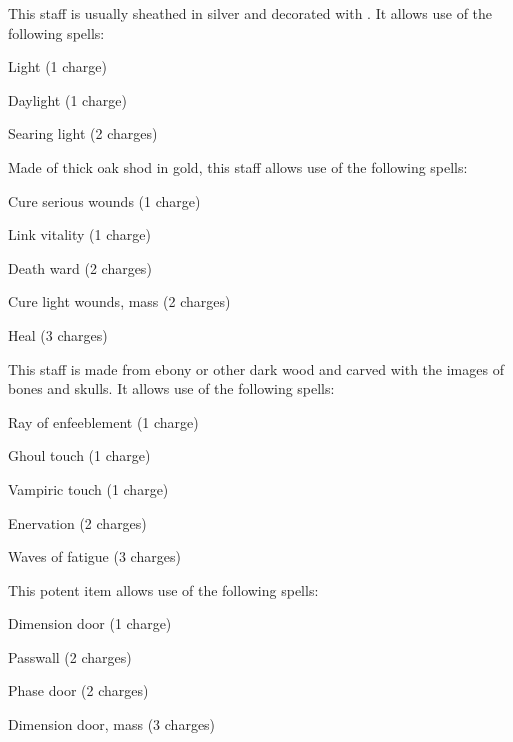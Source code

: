 
 This staff is usually sheathed in silver and decorated with . It allows use of the following spells:
\begin{itemize*}
\item Light (1 charge)
\item Daylight (1 charge)
\item Searing light (2 charges)
\end{itemize*}


 Made of thick oak shod in gold, this staff allows use of the following spells:
\begin{itemize*}
\item Cure serious wounds (1 charge)
\item Link vitality (1 charge)
\item Death ward (2 charges)
\item Cure light wounds, mass (2 charges)
\item Heal (3 charges)
\end{itemize*}


 This staff is made from ebony or other dark wood and carved with the images of bones and skulls. It allows use of the following spells:
\begin{itemize*}
\item Ray of enfeeblement (1 charge)
\item Ghoul touch (1 charge)
\item Vampiric touch (1 charge)
\item Enervation (2 charges)
\item Waves of fatigue (3 charges)
\end{itemize*}


 This potent item allows use of the following spells:
\begin{itemize*}
\item Dimension door (1 charge)
\item Passwall (2 charges)
\item Phase door (2 charges)
\item Dimension door, mass (3 charges)
\end{itemize*}

